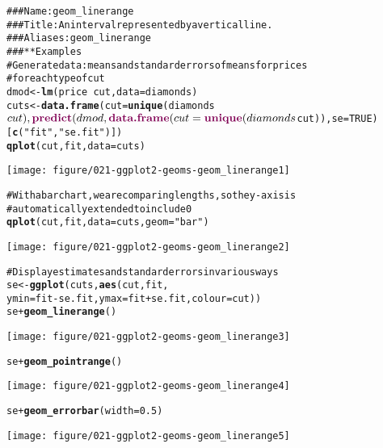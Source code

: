 \documentclass[a4paper,titlepage]{tufte-handout}\usepackage{graphicx, color}
\makeatletter
\def\maxwidth{ %
  \ifdim\Gin@nat@width>\linewidth
    \linewidth
  \else
    \Gin@nat@width
  \fi
}
\newcommand{\hlfunctioncall}[1]{\textcolor[rgb]{0.501960784313725,0,0.329411764705882}{\textbf{#1}}}%
\newcommand{\hlstring}[1]{\textcolor[rgb]{0.6,0.6,1}{#1}}%
\newcommand{\hlcomment}[1]{\textcolor[rgb]{0.180392156862745,0.6,0.341176470588235}{#1}}%
\newenvironment{kframe}{%
 \def\at@end@of@kframe{}%
 \ifinner\ifhmode%
  \def\at@end@of@kframe{\end{minipage}}%
  \begin{minipage}{\columnwidth}%
 \fi\fi%
 \def\FrameCommand##1{\hskip\@totalleftmargin \hskip-\fboxsep
 \colorbox{shadecolor}{##1}\hskip-\fboxsep
     \hskip-\linewidth \hskip-\@totalleftmargin \hskip\columnwidth}%
 \MakeFramed {\advance\hsize-\width
   \@totalleftmargin\z@ \linewidth\hsize
   \@setminipage}}%
 {\par\unskip\endMakeFramed%
 \at@end@of@kframe}
\newenvironment{knitrout}{}{} %
\makeatother
\begin{document}
\begin{knitrout}
\color{fgcolor}\begin{kframe}
\begin{alltt}
\hlcomment{### Name: geom_linerange}
\hlcomment{### Title: An interval represented by a vertical line.}
\hlcomment{### Aliases: geom_linerange}
\hlcomment{### ** Examples}
\hlcomment{# Generate data: means and standard errors of means for prices}
\hlcomment{# for each type of cut}
dmod <- \hlfunctioncall{lm}(price ~ cut, data=diamonds)
cuts <- \hlfunctioncall{data.frame}(cut=\hlfunctioncall{unique}(diamonds$cut), \hlfunctioncall{predict}(dmod, \hlfunctioncall{data.frame}(cut = \hlfunctioncall{unique}(diamonds$cut)), se=TRUE)[\hlfunctioncall{c}(\hlstring{"fit"},\hlstring{"se.fit"})])
\hlfunctioncall{qplot}(cut, fit, data=cuts)
\end{alltt}
\end{kframe}\texttt{[image: figure/021-ggplot2-geoms-geom\_linerange1]} \begin{kframe}\begin{alltt}
\hlcomment{# With a bar chart, we are comparing lengths, so the y-axis is}
\hlcomment{# automatically extended to include 0}
\hlfunctioncall{qplot}(cut, fit, data=cuts, geom=\hlstring{"bar"})
\end{alltt}
\end{kframe}\texttt{[image: figure/021-ggplot2-geoms-geom\_linerange2]} \begin{kframe}\begin{alltt}
\hlcomment{# Display estimates and standard errors in various ways}
se <- \hlfunctioncall{ggplot}(cuts, \hlfunctioncall{aes}(cut, fit,
  ymin = fit - se.fit, ymax=fit + se.fit, colour = cut))
se + \hlfunctioncall{geom_linerange}()
\end{alltt}
\end{kframe}\texttt{[image: figure/021-ggplot2-geoms-geom\_linerange3]} \begin{kframe}\begin{alltt}
se + \hlfunctioncall{geom_pointrange}()
\end{alltt}
\end{kframe}\texttt{[image: figure/021-ggplot2-geoms-geom\_linerange4]} \begin{kframe}\begin{alltt}
se + \hlfunctioncall{geom_errorbar}(width = 0.5)
\end{alltt}
\end{kframe}\texttt{[image: figure/021-ggplot2-geoms-geom\_linerange5]} \begin{kframe}\begin{alltt}

\end{alltt}
\end{kframe}
\end{knitrout}
\end{document}
